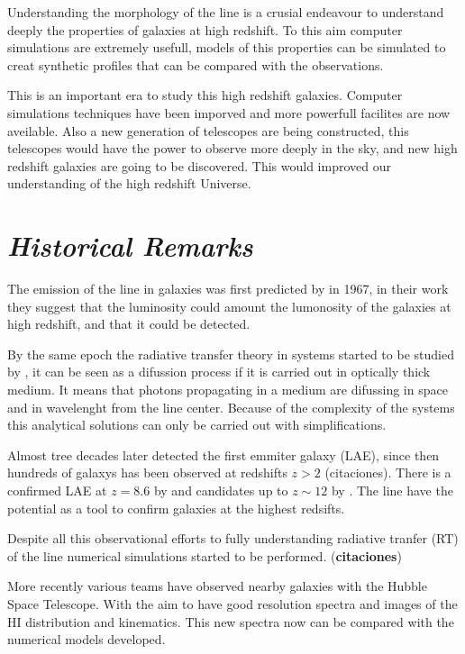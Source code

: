 Understanding the morphology of the \ly line is a crusial endeavour 
to understand deeply the properties of galaxies at high redshift. To this aim 
computer simulations are extremely usefull, models of this properties 
can be simulated to creat synthetic profiles that can be compared
with the observations. 

This is an important era to study this high redshift galaxies. Computer 
simulations techniques have been imporved and more powerfull facilites are
now aveilable. Also a new generation of telescopes are being constructed,
this telescopes would have the power to observe more deeply in the sky, 
and new high redshift galaxies are going to be discovered. This would 
improved our understanding of the high redshift Universe. 

\section{\emph{Historical Remarks}}

The emission of the \ly line in galaxies was first predicted by 
\citep{PartridgePeebles} in 1967, in their work they suggest that the \ly luminosity
could amount the lumonosity of the galaxies at high redshift, and that 
it could be detected. 

By the same epoch the radiative transfer theory in \ly systems started to be
 studied by \citep{Osterbrock62, Adams72,Harrington73, Neufeld90},
 it can be seen as a difussion process if it is carried out in 
 optically thick medium. It means that \ly photons propagating 
in a medium are difussing in space and in wavelenght from the line center.   
Because of the complexity of the systems this analytical solutions 
can only be carried out with simplifications. 


Almost tree decades later \citep{DjorgovskiThomson92} detected the first \ly emmiter galaxy (LAE), since then hundreds of galaxys has been  
observed at redshifts $z>2$ (citaciones). There is a confirmed LAE at $z=8.6$ by \citep{Lenhert2010} and candidates up to $z\sim12$ by \citep{Brammer12}. 
The \ly line have the potential as a tool to confirm galaxies at the highest 
redsifts. 

Despite all this observational efforts to fully understanding radiative
tranfer (RT) of the \ly line numerical simulations started to be performed.
({\bf{citaciones}})

More recently various teams \citep{Mas-Hesse09,LARS} have
observed nearby galaxies with the Hubble Space Telescope. With the
aim to have good resolution spectra and images of the HI distribution 
and kinematics. This new spectra now can be compared with the numerical 
models developed.

